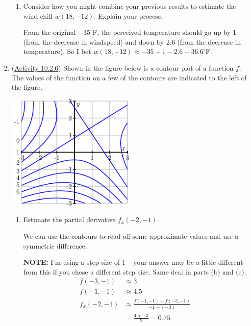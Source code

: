 \begin{enumerate}[leftmargin=0pt]
\begin{enumerate}
    \item Consider how you might combine your previous results to estimate the wind chill $w(18, -12)$. Explain your process.
    
    \begin{red}
    From the original $-35^\circ$F, the perceived temperature should go up by 1 (from the decrease in windspeed) and down by 2.6 (from the decrease in temperature). So I bet $w(18, -12) \approx -35 + 1 - 2.6 -36.6^\circ$F.
    \end{red}
\end{enumerate}
\item (\href{https://activecalculus.org/multi/S-10-2-First-Order-Partial-Derivatives.html#A_10_2_13}{Activity 10.2.6}) Shown in the figure below is a contour plot of a function $f$. The values of the function on a few of the contours are indicated to the left of the figure.
\begin{center}
    \includegraphics[width=0.5\textwidth]{../images/10-2-6.png}
\end{center}
\begin{enumerate}
    \item Estimate the partial derivative $f_x(-2, -1).$
    
    \begin{red}
    We can use the contours to read off some approximate values and use a symmetric difference. 
    
    \textbf{NOTE:} I'm using a step size of 1 -- your answer may be a little different from this if you chose a different step size. Same deal in parts (b) and (c).
    \begin{align*}
        f(-3, -1) &\approx 3 \\
        f(-1, -1) &\approx 4.5 \\
        f_x(-2,-1) &\approx 
        \frac{f(-1, -1)-f(-3, -1)}{-1-(-3)} \\
        &= \frac{4.5-3}{2} = 0.75
    \end{align*}
    \end{red}
    

\end{enumerate}
\end{enumerate}
